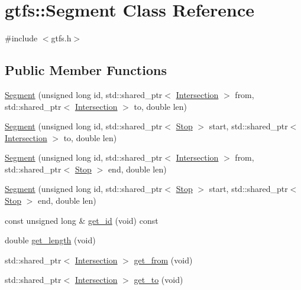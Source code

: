 \hypertarget{classgtfs_1_1Segment}{}\section{gtfs\+:\+:Segment Class Reference}
\label{classgtfs_1_1Segment}


{\ttfamily \#include $<$gtfs.\+h$>$}

\subsection*{Public Member Functions}
\begin{DoxyCompactItemize}
\item 
\hyperlink{classgtfs_1_1Segment_a3ffae4434816b887aaa0ad599ca1776a}{Segment} (unsigned long id, std\+::shared\+\_\+ptr$<$ \hyperlink{classgtfs_1_1Intersection}{Intersection} $>$ from, std\+::shared\+\_\+ptr$<$ \hyperlink{classgtfs_1_1Intersection}{Intersection} $>$ to, double len)
\item 
\hyperlink{classgtfs_1_1Segment_a20c723d86a9a716a802b81971258a8dd}{Segment} (unsigned long id, std\+::shared\+\_\+ptr$<$ \hyperlink{classgtfs_1_1Stop}{Stop} $>$ start, std\+::shared\+\_\+ptr$<$ \hyperlink{classgtfs_1_1Intersection}{Intersection} $>$ to, double len)
\item 
\hyperlink{classgtfs_1_1Segment_a9f528f4e1abd3bdca0f38b2e8ca48fc1}{Segment} (unsigned long id, std\+::shared\+\_\+ptr$<$ \hyperlink{classgtfs_1_1Intersection}{Intersection} $>$ from, std\+::shared\+\_\+ptr$<$ \hyperlink{classgtfs_1_1Stop}{Stop} $>$ end, double len)
\item 
\hyperlink{classgtfs_1_1Segment_ab3de55f7f97c97ecd4be08be380129d0}{Segment} (unsigned long id, std\+::shared\+\_\+ptr$<$ \hyperlink{classgtfs_1_1Stop}{Stop} $>$ start, std\+::shared\+\_\+ptr$<$ \hyperlink{classgtfs_1_1Stop}{Stop} $>$ end, double len)
\item 
const unsigned long \& \hyperlink{classgtfs_1_1Segment_a5c324888b7535df4623d8f32d907fca3}{get\+\_\+id} (void) const
\item 
double \hyperlink{classgtfs_1_1Segment_a4f42ea597e18e54c9ec506697eb333a9}{get\+\_\+length} (void)
\item 
std\+::shared\+\_\+ptr$<$ \hyperlink{classgtfs_1_1Intersection}{Intersection} $>$ \hyperlink{classgtfs_1_1Segment_ae43fcbd6aab7e468122f0110a2d60968}{get\+\_\+from} (void)
\item 
std\+::shared\+\_\+ptr$<$ \hyperlink{classgtfs_1_1Intersection}{Intersection} $>$ \hyperlink{classgtfs_1_1Segment_aba473075f7a10db66b5b99890c39852f}{get\+\_\+to} (void)

\end{DoxyCompactItemize}

